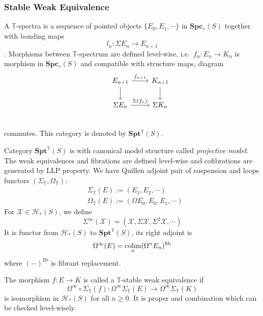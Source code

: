 \documentclass[b5paper,10pt]{article}
\begin{document}
\subsubsection{Stable Weak Equivalence}
\begin{secdefn}
	A $\mathbb{T}$-spectra is a sequence of pointed objects $\{ E_0, E_1 ,\cdots\}$ in $\mathbf{Spc}_*(S)$ together with bonding maps
	\[
	l_n \colon \Sigma E_{n} \to  E_{n+1}
	\].	
	Morphisms between $\mathbb{T}$-spectrum are defined level-wise, i.e.\ $f_n \colon E_n \to K_n$ is morphism in $\mathbf{Spc}_*(S)$ and compatible with structure maps, diagram
	\[
	\begin{tikzcd}
	&E_{n+1} \ar[r,"f_{n+1}"] \ar[d]& K_{n+1} \ar[d]\\
	&\Sigma E_{n} \ar[r,"\Sigma (f_{n})"] & \Sigma K_{n}\\
	\end{tikzcd}
	\]
	commutes.
	 This category is denoted by $\mathbf{Spt^{\mathbb{T}}}(S)$.
\end{secdefn}
Category $\mathbf{Spt^{\mathbb{T}}}(S)$ is with canonical model structure called \emph{projective model}: The weak equivalences and fibrations are defined level-wise and cofibrations are generated by LLP property. We have Quillen adjoint pair of suspension and loops functors $(\Sigma_\mathbb{T}, \Omega_\mathbb{T})$:
\[
\begin{aligned}
&\Sigma_\mathbb{T}(E) := (E_1, E_2 ,\cdots)\\
&\Omega_{\mathbb{T}}(E) := (\Omega E_0, E_0, E_1,\cdots)
\end{aligned}
\]
For $\mathcal{X} \in \mathcal{H}_*(S)$, we define
\[
\Sigma^{\infty}(\mathcal{X}) = (\mathcal{X} , \Sigma \mathcal{X}, \Sigma^2 \mathcal{X}, \cdots)\]
It is functor from $\mathcal{H}_*(S)$ to $\mathbf{Spt}^{\mathbb{T}}(S)$, its right adjoint is 
\[
\Omega^{\infty}(E)= \operatorname*{colim}_n( \Omega^n E_n)^{\text{fib}}
\]
where $(-)^{\text{fib}}$ is fibrant replacement.
\begin{secdefn}
	The morphism $f \colon E \to K$ is called a $\mathbb{T}$-stable weak equivalence if 
	\[
	\Omega^{\infty}\circ \Sigma_{\mathbb{T}} (f) \colon \Omega^{\infty} \Sigma_{\mathbb{T}}(E) \to \Omega^{\infty} \Sigma_{\mathbb{T}}(K)
	\]
	is isomorphism in $\mathcal{H}_*(S)$ for all $n \geq 0$. It is proper and combination which can be checked level-wisely.
\end{secdefn}
\end{document}
